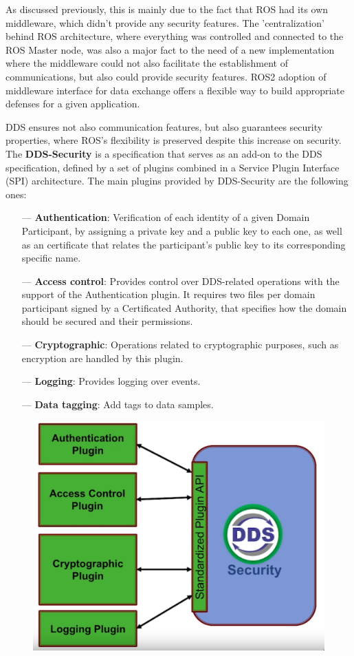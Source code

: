 As discussed previously, this is mainly due to the fact that ROS had its own middleware, which didn't provide any security features. The 'centralization' behind ROS architecture, where everything was controlled and connected to the ROS Master node, was also a major fact to the need of a new implementation where the middleware could not also facilitate the establishment of communications, but also could provide security features. ROS2 adoption of middleware interface for data exchange offers a flexible way to build appropriate defenses for a given application.

DDS ensures not also communication features, but also guarantees security properties, where ROS's flexibility is preserved despite this increase on security. The \textbf{DDS-Security} is a specification that serves as an add-on to the DDS specification, defined by a set of plugins combined in a Service Plugin Interface (SPI) architecture. The main plugins provided by DDS-Security are the following ones:
            
\begin{itemize}
    \item[---] \textbf{Authentication}: Verification of each identity of a given Domain Participant, by assigning a private key and a public key to each one, as well as an certificate that relates the participant's public key to its corresponding specific name.
    \item[---] \textbf{Access control}: Provides control over DDS-related operations with the support of the Authentication plugin. It requires two files per domain participant signed by a Certificated Authority, that specifies how the domain should be secured and their permissions.
    \item[---] \textbf{Cryptographic}: Operations related to cryptographic purposes, such as encryption are handled by this plugin.
    \item[---] \textbf{Logging}: Provides logging over events.
    \item[---] \textbf{Data tagging}: Add tags to data samples.
\end{itemize}

\begin{figure}[H]
    \centering
    \includegraphics[width=0.5\linewidth]{images/dds-security.png}
\end{figure}
            
